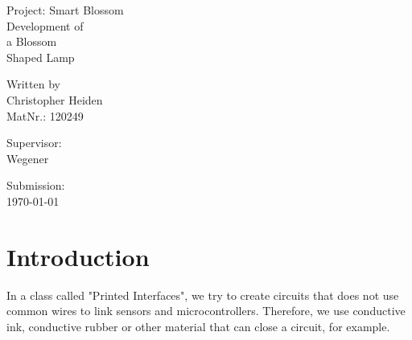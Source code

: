\documentclass[12pt,twoside,a4paper]{article}
\begin{document}
    \begin{titlepage}
        \noindent
        Project: Smart Blossom
        \vspace{2em}
        \\
        {\fontsize{40}{50}\selectfont
        Development of \\[0.5em]
        a Blossom \\[0.5em]
        Shaped Lamp \\[0.5em]
        }
        \vspace*{\fill}
        \small 

        \hspace*{\fill} Written by \\
        \hspace*{\fill} Christopher Heiden \\
        \hspace*{\fill} MatNr.: 120249 \\
        \vspace{2em}

        \hspace*{\fill} Supervisor:  \\
        \hspace*{\fill} Wegener \\
        \vspace{2em}

        \hspace*{\fill} Submission: \\
        \hspace*{\fill} \bkdate\today
        
    \end{titlepage}
    \newpage

    \tableofcontents
    \newpage

    \setcounter{page}{3}

    \section{Introduction}
    \begin{flushleft}
        In a class called "Printed Interfaces", we try to create circuits that does not use common wires 
        to link sensors and microcontrollers. Therefore, we use conductive ink, conductive rubber or other
        material that can close a circuit, for example.\newline
    \end{flushleft}
\end{document}
